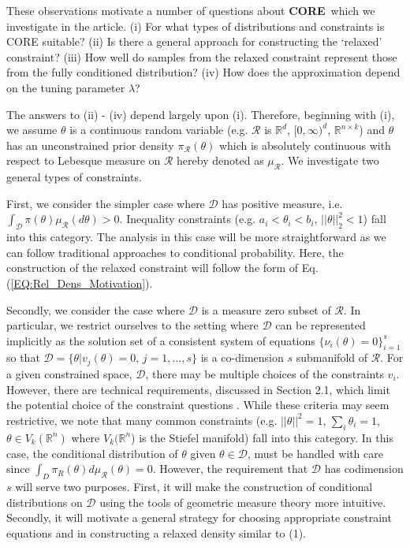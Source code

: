 \documentclass[10pt,fleqn]{article}
\newcommand{\leo}[1]{{\color{blue}{Leo: #1}}}
\newcommand{\core}{\textbf{CORE}}
\DeclareMathOperator{\1}{\mathbbm{1}}
\begin{document}
{These observations motivate a number of questions about \core\, which we investigate in the article.  (i) For what types of distributions and constraints is CORE suitable? (ii) Is there a general approach for constructing the `relaxed' constraint? (iii) How well do samples from the relaxed constraint represent those from the fully conditioned distribution? (iv) How does the approximation depend on the tuning parameter $\lambda$? 

The answers to (ii) - (iv) depend largely upon (i).  Therefore, beginning with (i), we assume $\theta$ is a continuous random variable (e.g. $\mathcal{R}$ is $\mathbb{R}^d$, $[0,\infty)^d$, $\mathbb{R}^{n\times k}$) and $\theta$ has an unconstrained prior density $\pi_\mathcal{R}(\theta)$ which is absolutely continuous with respect to Lebesque measure on $\mathcal{R}$ hereby denoted as $\mu_\mathcal{R}$.  We investigate two general types of constraints. 



First, we consider the simpler case where $\mathcal{D}$ has positive measure, i.e. $\int_\mathcal{D} \pi(\theta) \mu_\mathcal{R}(d\theta) >0.$ \leo{Generally,} Inequality constraints (e.g. $a_i < \theta_i < b_i$, $||\theta||_2^2 < 1$) fall into this category. The analysis in this case will be more straightforward as we can follow traditional approaches to conditional probability. Here, the construction of the relaxed constraint will follow the form of Eq. (\ref{EQ:Rel_Dens_Motivation}).

Secondly, we consider the case where $\mathcal{D}$ is a measure zero subset of $\mathcal{R}$. In particular, we restrict ourselves to the setting where $\mathcal{D}$ can be represented implicitly as the solution set of a consistent system of equations $\{\nu_i(\theta) = 0\}_{i=1}^s$ so that $\mathcal{D} =\{\theta | v_j(\theta) =0, \, j = 1, \dots,s\}$ is a co-dimension $s$ submanifold of $\mathcal{R}$.  For a given constrained space, $\mathcal{D}$, there may be multiple choices of the constraints $v_i$. However, there are technical requirements, discussed in Section 2.1, which limit the potential choice of the constraint questions \leo{perhaps avoid cross-referencing
later section, by simplifying this sentence
to `There are some limitations on the types of constraint one could use,
however we note that ...'}. While these criteria may seem restrictive, we note that many common constraints (e.g. $||\theta||^2 = 1$, $\sum_i \theta_i = 1$, $\theta \in V_k(\mathbb{R}^n)$ where $V_k(\mathbb{R}^n$) is the Stiefel manifold) fall into this category.  In this case, the conditional distribution of $\theta$ given $\theta \in \mathcal{D}$, must be handled with care since $\int_D \pi_R(\theta) d\mu_\mathcal{R} (\theta) =0$.  However, the requirement that $\mathcal{D}$ has codimension $s$ will serve two purposes.  First, it will make the construction of conditional distributions on $\mathcal{D}$ using the tools of geometric measure theory more intuitive.  Secondly, it will motivate a general strategy for choosing appropriate constraint equations and in constructing a relaxed density similar to (1). 


}
\end{document}
